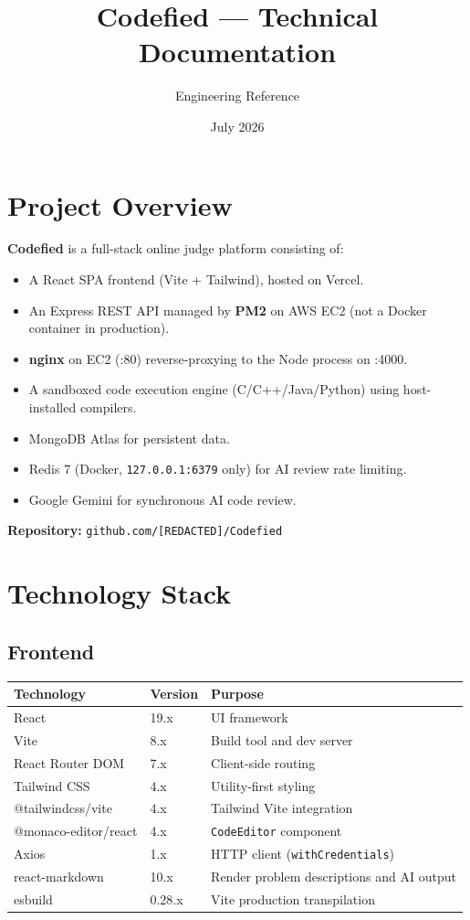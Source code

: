 \documentclass[11pt,a4paper]{article}
\title{\textbf{Codefied --- Technical Documentation}}
\author{Engineering Reference}
\date{July 2026}
\newcommand{\maskedrepo}{\texttt{github.com/[REDACTED]/Codefied}}
\begin{document}
\maketitle
\tableofcontents
\newpage

\section{Project Overview}

\textbf{Codefied} is a full-stack online judge platform consisting of:
\begin{itemize}[noitemsep]
  \item A React SPA frontend (Vite + Tailwind), hosted on Vercel.
  \item An Express REST API managed by \textbf{PM2} on AWS EC2 (not a Docker container in production).
  \item \textbf{nginx} on EC2 (:80) reverse-proxying to the Node process on :4000.
  \item A sandboxed code execution engine (C/C++/Java/Python) using host-installed compilers.
  \item MongoDB Atlas for persistent data.
  \item Redis 7 (Docker, \texttt{127.0.0.1:6379} only) for AI review rate limiting.
  \item Google Gemini for synchronous AI code review.
\end{itemize}

\textbf{Repository:} \maskedrepo

\section{Technology Stack}

\subsection{Frontend}
\begin{table}[h]
\centering
\small
\begin{tabular}{@{}lll@{}}
\toprule
\textbf{Technology} & \textbf{Version} & \textbf{Purpose} \\
\midrule
React               & 19.x   & UI framework \\
Vite                & 8.x    & Build tool and dev server \\
React Router DOM    & 7.x    & Client-side routing \\
Tailwind CSS        & 4.x    & Utility-first styling \\
@tailwindcss/vite   & 4.x    & Tailwind Vite integration \\
@monaco-editor/react& 4.x    & \texttt{CodeEditor} component \\
Axios               & 1.x    & HTTP client (\texttt{withCredentials}) \\
react-markdown      & 10.x   & Render problem descriptions and AI output \\
esbuild             & 0.28.x & Vite production transpilation \\
\bottomrule
\end{tabular}
\end{table}
\end{document}
